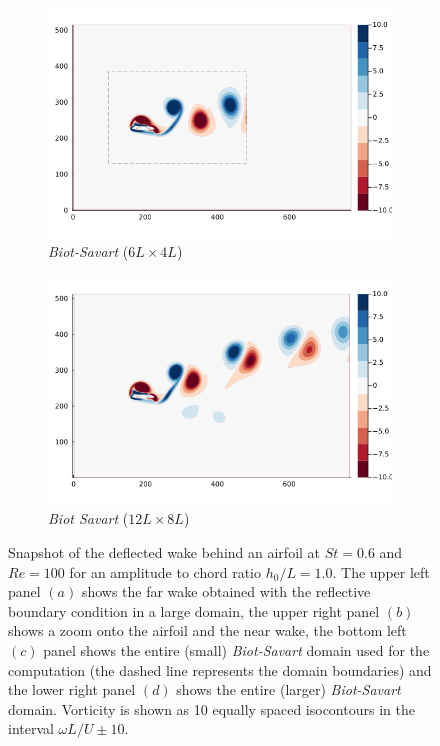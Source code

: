 \documentclass[preprint,12pt]{elsarticle}
\begin{document}
\begin{figure}
\begin{subfigure}{.48\textwidth}
        \includegraphics[trim={2.8cm 2cm 4cm 2cm},clip,width=\textwidth]{tex//fig/Deflected_wake_snap_BS.png}
        \caption{\emph{Biot-Savart} ($6L\times4L$)}
    \end{subfigure}%
    \hspace{0.1cm}
    \begin{subfigure}{.48\textwidth}
        \centering
        \includegraphics[trim={2.8cm 2cm 4cm 2cm},clip,width=\textwidth]{tex//fig/Deflected_wake_snap_BS_2x.png}
        \caption{\emph{Biot Savart} ($12L\times8L$)}
    \end{subfigure}
    \caption{Snapshot of the deflected wake behind an airfoil at $St=0.6$ and $Re=100$ for an amplitude to chord ratio $h_0/L=1.0$. The upper left panel $(a)$ shows the far wake obtained with the reflective boundary condition in a large domain, the upper right panel $(b)$ shows a zoom onto the airfoil and the near wake, the bottom left $(c)$ panel shows the entire (small) \emph{Biot-Savart} domain used for the computation (the dashed line represents the domain boundaries) and the lower right panel $(d)$ shows the entire (larger) \emph{Biot-Savart} domain. Vorticity is shown as 10 equally spaced isocontours in the interval $\omega L/U \pm 10$.}
    \label{fig:deflected_wake}
\end{figure}
\end{document}

